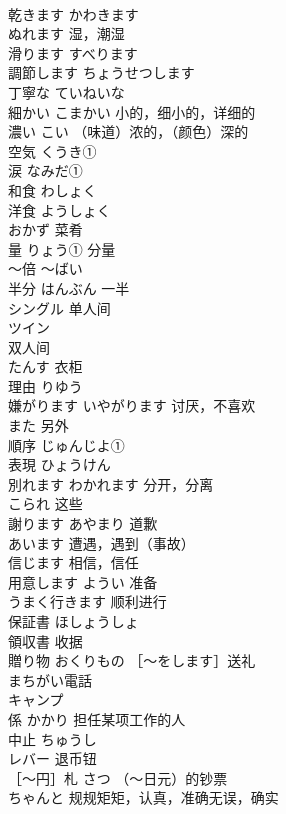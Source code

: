\documentclass[8pt]{extreport}
\begin{document}
\begin{CJK}{UTF8}{min}
\\	乾きます	かわきます	
\\	ぬれます	湿，潮湿	
\\	滑ります	すべります	
\\	調節します	ちょうせつします	
\\	丁寧な	ていねいな	
\\	細かい	こまかい 小的，细小的，详细的	
\\	濃い	こい （味道）浓的，（颜色）深的	
\\	空気	くうき①	
\\	涙	なみだ①	
\\	和食	わしょく	
\\	洋食	ようしょく	
\\	おかず	菜肴	
\\	量	りょう① 分量	
\\	〜倍	〜ばい	
\\	半分	はんぶん 一半	
\\	シングル	单人间 
\\	ツイン	
\\	双人间	
\\	たんす	衣柜	
\\	理由	りゆう	
\\	嫌がります	いやがります 讨厌，不喜欢	
\\	また	另外	
\\	順序	じゅんじよ①	
\\	表現	ひょうけん	
\\	別れます	わかれます 分开，分离	
\\	こられ	这些	
\\	謝ります	あやまり 道歉	
\\	あいます	遭遇，遇到（事故）	
\\	信じます	相信，信任	
\\	用意します	ようい 准备	
\\	うまく行きます	顺利进行	
\\	保証書	ほしょうしょ	
\\	領収書	收据	
\\	贈り物	おくりもの ［〜をします］送礼	
\\	まちがい電話		
\\	キャンプ	
\\	係	かかり 担任某项工作的人	
\\	中止	ちゅうし	
\\	レバー	退币钮	
\\	［〜円］札	さつ （～日元）的钞票	
\\	ちゃんと	规规矩矩，认真，准确无误，确实	

\end{CJK}
\end{document}
